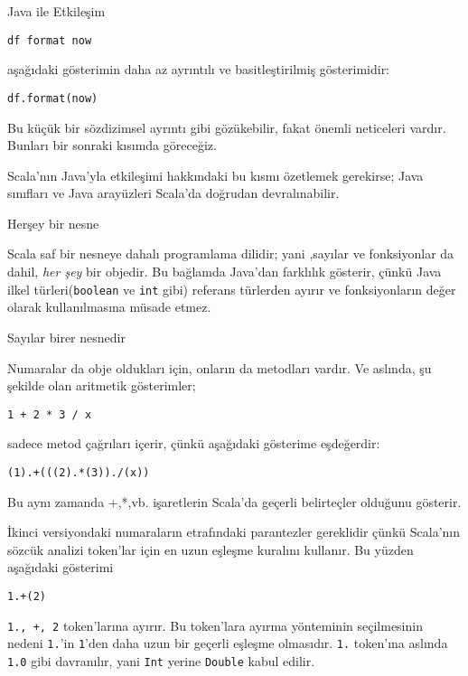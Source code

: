 \documentclass[10pt,a4paper]{book}
\begin{document}
\begin{chapter}{Java ile Etkileşim}
\begin{verbatim}
df format now
\end{verbatim}

aşağıdaki gösterimin daha az ayrıntılı ve basitleştirilmiş gösterimidir:

\begin{verbatim}
df.format(now)
\end{verbatim}

Bu küçük bir sözdizimsel ayrıntı gibi gözükebilir, fakat önemli neticeleri vardır. Bunları bir sonraki kısımda göreceğiz.

Scala'nın Java'yla etkileşimi hakkındaki bu kısmı özetlemek gerekirse; Java sınıfları ve Java arayüzleri Scala'da doğrudan devralınabilir.
\end{chapter}

\begin{chapter}{Herşey bir nesne}

Scala saf bir nesneye dahalı programlama dilidir; yani ,sayılar ve fonksiyonlar da dahil, \textit{her şey} bir objedir. Bu bağlamda Java'dan farklılık gösterir, çünkü Java ilkel türleri(\texttt{boolean} ve \texttt{int} gibi) referans türlerden ayırır ve fonksiyonların değer olarak kullanılmasına müsade etmez.

\begin{section}{Sayılar birer nesnedir}

Numaralar da obje oldukları için, onların da metodları vardır. Ve aslında, şu şekilde olan aritmetik gösterimler;

\begin{verbatim}
1 + 2 * 3 / x
\end{verbatim}

sadece metod çağrıları içerir, çünkü aşağıdaki gösterime eşdeğerdir:

\begin{verbatim}
(1).+(((2).*(3))./(x))
\end{verbatim}

Bu aynı zamanda +,*,vb. işaretlerin Scala'da geçerli belirteçler olduğunu gösterir.

İkinci versiyondaki numaraların etrafındaki parantezler gereklidir çünkü Scala'nın sözcük analizi token'lar için en uzun eşleşme kuralını kullanır. Bu yüzden aşağıdaki gösterimi

\begin{verbatim}
1.+(2)
\end{verbatim}

\texttt{1., +, 2} token'larına ayırır. Bu token'lara ayırma yönteminin seçilmesinin nedeni \texttt{1.}'in \texttt{1}'den daha uzun bir geçerli eşleşme olmasıdır. \texttt{1.} token'ına aslında \texttt{1.0} gibi davranılır, yani \texttt{Int} yerine \texttt{Double} kabul edilir.


\end{section}
\end{chapter}
\end{document}

